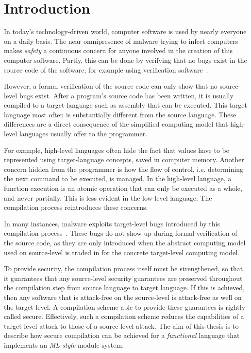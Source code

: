\chapter{Introduction}

In today's technology-driven world, computer software is used by nearly everyone on a daily basis.
The near omnipresence of malware trying to infect computers makes \emph{safety} a continuous concern for anyone involved in the creation of this computer software.
Partly, this can be done by verifying that no bugs exist in the source code of the software, for example using verification software~\cite{Verifast:paper,Verifast:tutorial}.

However, a formal verification of the source code can only show that no source-level bugs exist.
After a program's source code has been written, it is usually compiled to a target language such as assembly that can be executed.
This target language most often is substantially different from the source language.
These differences are a direct consequence of the simplified computing model that high-level languages usually offer to the programmer.

For example, high-level languages often hide the fact that values have to be represented using target-language concepts, saved in computer memory.
Another concern hidden from the programmer is how the flow of control, i.e. determining the next command to be executed, is managed.
In the high-level language, a function execution is an atomic operation that can only be executed as a whole, and never partially. This is less evident in the low-level language.
The compilation process reintroduces these concerns.

In many instances, malware exploits target-level bugs introduced by this compilation process~\cite{OVSPaper,Younan:2012:RCC:2187671.2187679}.
These bugs do not show up during formal verification of the source code, as they are only introduced when the abstract computing model used on source-level is traded in for the concrete target-level computing model.

To provide security, the compilation process itself must be strengthened, so that it guarantees that any source-level security guarantees are preserved throughout the compilation step from source language to target language.
If this is achieved, then any software that is attack-free on the source-level is attack-free as well on the target-level.
A compilation scheme able to provide these guarantees is rightly called secure.
Effectively, such a compilation scheme reduces the capabilities of a target-level attack to those of a source-level attack.
The aim of this thesis is to describe how secure compilation can be achieved for a \emph{functional} language that implements an \emph{ML-style} module system.

